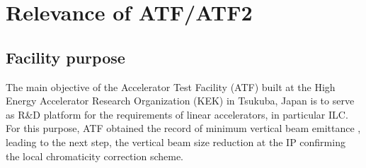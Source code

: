 \chapter{Relevance of ATF/ATF2}
\section{Facility purpose}
The main objective of the Accelerator Test Facility (ATF) built at the High Energy Accelerator Research Organization (KEK) in Tsukuba, Japan is to serve as R\&D platform for the requirements of linear accelerators, in particular ILC. For this purpose, ATF obtained the record of minimum vertical beam emittance \cite{Kubo:2001ps,PhysRevLett.92.054802}, leading to the next step, the vertical beam size reduction at the IP confirming the local chromaticity correction scheme.\par
